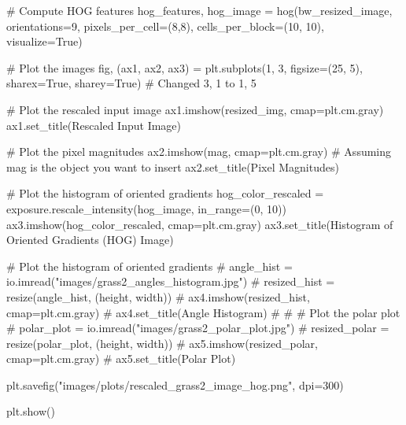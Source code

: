 \documentclass[
  letterpaper,
]{report}
\newenvironment{Shaded}{\begin{snugshade}}{\end{snugshade}}
\newcommand{\CommentTok}[1]{\textcolor[rgb]{0.37,0.37,0.37}{#1}}
\newcommand{\DecValTok}[1]{\textcolor[rgb]{0.68,0.00,0.00}{#1}}
\newcommand{\NormalTok}[1]{\textcolor[rgb]{0.00,0.23,0.31}{#1}}
\newcommand{\OperatorTok}[1]{\textcolor[rgb]{0.37,0.37,0.37}{#1}}
\newcommand{\StringTok}[1]{\textcolor[rgb]{0.13,0.47,0.30}{#1}}
\newcommand{\VariableTok}[1]{\textcolor[rgb]{0.07,0.07,0.07}{#1}}
\begin{document}
\begin{Shaded}
\begin{Highlighting}[]
\CommentTok{\# Compute HOG features}
\NormalTok{hog\_features, hog\_image }\OperatorTok{=}\NormalTok{ hog(bw\_resized\_image, orientations}\OperatorTok{=}\DecValTok{9}\NormalTok{, pixels\_per\_cell}\OperatorTok{=}\NormalTok{(}\DecValTok{8}\NormalTok{,}\DecValTok{8}\NormalTok{),}
\NormalTok{                              cells\_per\_block}\OperatorTok{=}\NormalTok{(}\DecValTok{10}\NormalTok{, }\DecValTok{10}\NormalTok{), visualize}\OperatorTok{=}\VariableTok{True}\NormalTok{)}

\CommentTok{\# Plot the images}
\NormalTok{fig, (ax1, ax2, ax3) }\OperatorTok{=}\NormalTok{ plt.subplots(}\DecValTok{1}\NormalTok{, }\DecValTok{3}\NormalTok{, figsize}\OperatorTok{=}\NormalTok{(}\DecValTok{25}\NormalTok{, }\DecValTok{5}\NormalTok{), sharex}\OperatorTok{=}\VariableTok{True}\NormalTok{, sharey}\OperatorTok{=}\VariableTok{True}\NormalTok{)  }\CommentTok{\# Changed 3, 1 to 1, 5}

\CommentTok{\# Plot the rescaled input image}
\NormalTok{ax1.imshow(resized\_img, cmap}\OperatorTok{=}\NormalTok{plt.cm.gray)}
\NormalTok{ax1.set\_title(}\StringTok{\textquotesingle{}Rescaled Input Image\textquotesingle{}}\NormalTok{)}

\CommentTok{\# Plot the pixel magnitudes}
\NormalTok{ax2.imshow(mag, cmap}\OperatorTok{=}\NormalTok{plt.cm.gray)  }\CommentTok{\# Assuming mag is the object you want to insert}
\NormalTok{ax2.set\_title(}\StringTok{\textquotesingle{}Pixel Magnitudes\textquotesingle{}}\NormalTok{)}

\CommentTok{\# Plot the histogram of oriented gradients}
\NormalTok{hog\_color\_rescaled }\OperatorTok{=}\NormalTok{ exposure.rescale\_intensity(hog\_image, in\_range}\OperatorTok{=}\NormalTok{(}\DecValTok{0}\NormalTok{, }\DecValTok{10}\NormalTok{))}
\NormalTok{ax3.imshow(hog\_color\_rescaled, cmap}\OperatorTok{=}\NormalTok{plt.cm.gray)}
\NormalTok{ax3.set\_title(}\StringTok{\textquotesingle{}Histogram of Oriented Gradients (HOG) Image\textquotesingle{}}\NormalTok{)}

\CommentTok{\# Plot the histogram of oriented gradients}
\CommentTok{\# angle\_hist = io.imread("images/grass2\_angles\_histogram.jpg")}
\CommentTok{\# resized\_hist = resize(angle\_hist, (height, width))}
\CommentTok{\# ax4.imshow(resized\_hist, cmap=plt.cm.gray)}
\CommentTok{\# ax4.set\_title(\textquotesingle{}Angle Histogram\textquotesingle{})}
\CommentTok{\# }
\CommentTok{\# \# Plot the polar plot}
\CommentTok{\# polar\_plot = io.imread("images/grass2\_polar\_plot.jpg")}
\CommentTok{\# resized\_polar = resize(polar\_plot, (height, width))}
\CommentTok{\# ax5.imshow(resized\_polar, cmap=plt.cm.gray)}
\CommentTok{\# ax5.set\_title(\textquotesingle{}Polar Plot\textquotesingle{})}

\NormalTok{plt.savefig(}\StringTok{"images/plots/rescaled\_grass2\_image\_hog.png"}\NormalTok{, dpi}\OperatorTok{=}\DecValTok{300}\NormalTok{)}

\NormalTok{plt.show()}
\end{Highlighting}
\end{Shaded}
\end{document}
